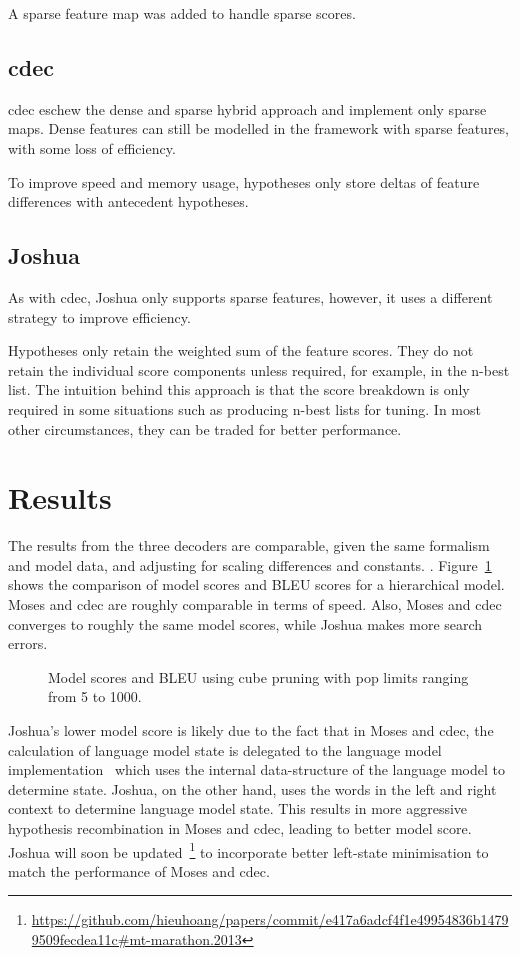 \documentclass{pbml}
\begin{document}
A sparse feature map was added to handle sparse scores.

\subsection{cdec}
cdec eschew the dense and sparse hybrid approach and implement only sparse maps. Dense features can still be modelled in the framework with sparse features, with some loss of efficiency.

To improve speed and memory usage, hypotheses only store deltas of feature differences with antecedent hypotheses.

\subsection{Joshua}
As with cdec, Joshua only supports sparse features, however, it uses a different strategy to improve efficiency.

Hypotheses only retain the weighted sum of the feature scores. They do not retain the individual score components unless required, for example, in the n-best list. The intuition behind this approach is that the score breakdown is only required in some situations such as producing n-best lists for tuning. In most other circumstances, they can be traded for better performance.
  
\section{Results}

The results from the three decoders are comparable, given the same formalism and model data, and adjusting for scaling differences and constants. . Figure~\ref{fig:model} shows the comparison of model scores and BLEU scores for a hierarchical model. Moses and cdec are roughly comparable in terms of speed. Also, Moses and cdec converges to roughly the same model scores, while Joshua makes more search errors. 

\begin{figure}

\caption{\label{fig:model}Model scores and BLEU using cube pruning with pop limits ranging from 5 to 1000.}
\end{figure} 

Joshua's lower model score is likely due to the fact that in Moses and cdec, the calculation of language model state is delegated to the language model implementation~\cite{Heafield-left} which uses the internal data-structure of the language model to determine state. Joshua, on the other hand, uses the words in the left and right context to determine language model state. This results in more aggressive hypothesis recombination in Moses and cdec, leading to better model score. Joshua will soon be updated~\footnote{\url{https://github.com/hieuhoang/papers/commit/e417a6adcf4f1e49954836b14799509fecdea11c#mt-marathon.2013} } to incorporate better left-state minimisation to match the performance of Moses and cdec. 
\end{document}

